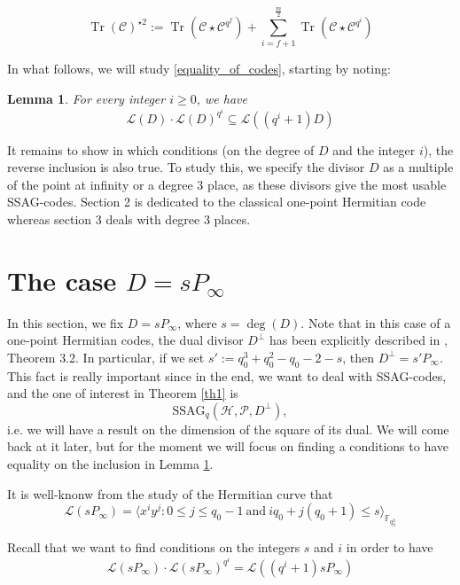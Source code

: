\documentclass[a4paper]{article}
\newtheorem{lem1}{Lemma}
\newcommand{\calP}{\mathcal{P}}
\newcommand{\calH}{\mathcal{H}}
\newcommand{\calL}{\mathcal{L}}
\newcommand{\Tr}{\operatorname{Tr}}
\begin{document}
\begin{equation}\label{eq:dim_tr_inclusion}
 \Tr(\mathcal{C})^{\star2}:=\Tr(\mathcal{C} \star \mathcal{C}^{q^f}) + \sum_{i= f+1}^{\frac{m}{2}} \Tr(\mathcal{C} \star \mathcal{C}^{q^i})
\end{equation}

In what follows, we will study \eqref{equality_of_codes}, starting by noting: 

\begin{lem1} \label{lemma1}
For every integer $i \geq 0$, we have
\[\calL(D) \cdot \calL(D)^{q^i} \subseteq \calL((q^i+1)D)\]
\end{lem1}

It remains to show in which conditions (on the degree of $D$ and the integer $i$), the reverse inclusion is also true. To study this, we specify the divisor $D$ as a multiple of the point at infinity or a degree 3 place, as these divisors give the most usable SSAG-codes. Section 2 is dedicated to the classical one-point Hermitian code whereas section 3 deals with degree 3 places.


\section{The case $D=sP_{\infty}$}

In this section, we fix $D=sP_{\infty}$, where $s=\deg(D)$. Note that in this case of a one-point Hermitian codes, the dual divisor $D^{\perp}$ has been explicitly described in \cite{sabi}, Theorem 3.2. In particular, if we set $s' := q_0^3+q_0^2-q_0-2-s$, then $D^{\perp} = s'P_{\infty}$. This fact is really important since in the end, we want to deal with \textrm{SSAG}-codes, and the one of interest in Theorem \ref{th1} is 
\[\mathrm{SSAG}_{q}(\calH,\calP,D^{\perp}),\]
i.e. we will have a result on the dimension of the square of its dual. We will come back at it later, but for the moment we will focus on finding a conditions to have equality on the inclusion in Lemma \ref{lemma1}. 

\noindent It is well-knonw from the study of the Hermitian curve that
\begin{equation} \label{rr_p_inf}
\calL(sP_{\infty}) = \langle x^iy^j : 0 \leq j \leq q_0-1 \ \mathrm{and} \ iq_0+j(q_0+1) \leq s \rangle_{\mathbb{F}_{q_0^2}}
\end{equation}

Recall that we want to find conditions on the integers $s$ and $i$ in order to have 
\begin{equation} \label{equality}
\calL(sP_{\infty}) \cdot \calL(sP_{\infty})^{q^i} = \calL((q^i+1)sP_{\infty})  
\end{equation}
\end{document}
